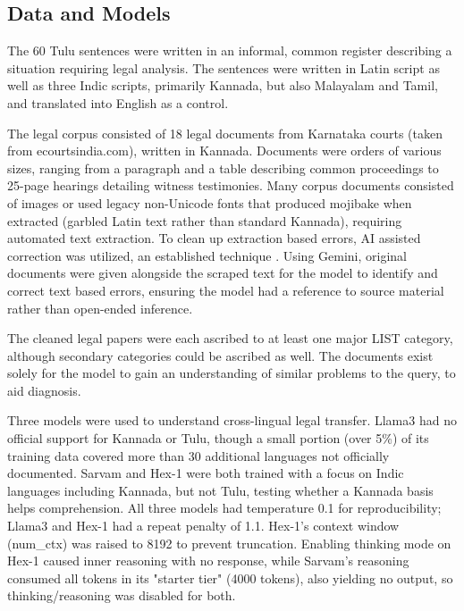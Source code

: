 \documentclass[11pt]{article}
\begin{document}
\subsection{Data and Models}
\label{subsec:data-models}
The 60 Tulu sentences were written in an informal, common register describing a situation requiring legal analysis. The sentences were written in Latin script as well as three Indic scripts, primarily Kannada, but also Malayalam and Tamil, and translated into English as a control.

The legal corpus consisted of 18 legal documents from Karnataka courts (taken from ecourtsindia.com), written in Kannada. Documents were orders of various sizes, ranging from a paragraph and a table describing common proceedings to 25-page hearings detailing witness testimonies. Many corpus documents consisted of images or used legacy non-Unicode fonts that produced mojibake when extracted (garbled Latin text rather than standard Kannada), requiring automated text extraction. To clean up extraction based errors, AI assisted correction was utilized, an established technique \citep{kanerva2025ocr}. Using Gemini, original documents were given alongside the scraped text for the model to identify and correct text based errors, ensuring the model had a reference to source material rather than open-ended inference. 

The cleaned legal papers were each ascribed to at least one major LIST category, although secondary categories could be ascribed as well. The documents exist solely for the model to gain an understanding of similar problems to the query, to aid diagnosis.

Three models were used to understand cross-lingual legal transfer. Llama3 \citep{meta2024llama3} had no official support for Kannada or Tulu, though a small portion (over 5\%) of its training data covered more than 30 additional languages not officially documented. Sarvam \citep{sarvamai_models} and Hex-1 \citep{budecosystem2025hex1} were both trained with a focus on Indic languages including Kannada, but not Tulu, testing whether a Kannada basis helps comprehension. All three models had temperature 0.1 for reproducibility; Llama3 and Hex-1 had a repeat penalty of 1.1. Hex-1's context window (num\_ctx) was raised to 8192 to prevent truncation. Enabling thinking mode on Hex-1 caused inner reasoning with no response, while Sarvam's reasoning consumed all tokens in its "starter tier" (4000 tokens), also yielding no output, so thinking/reasoning was disabled for both. 
\end{document}
